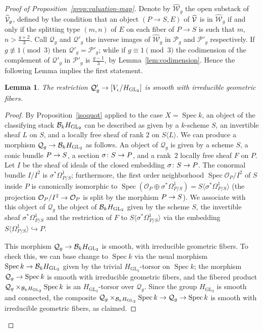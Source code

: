 \documentclass{amsart}
\numberwithin{equation}{section}
\numberwithin{subsection}{section}
\newtheorem{lemma}[theorem]{Lemma}
\theoremstyle{definition}
\theoremstyle{remark}
\newcommand\cO{\mathcal{O}} \newcommand\cP{\mathcal{P}}
\newcommand\cQ{\mathcal{Q}} \newcommand\cR{\mathcal{R}}
\newcommand\cW{\mathcal{W}} \newcommand\cX{\mathcal{X}}
\newcommand\arr{\ifinner\to\else\longrightarrow\fi}
\newcommand\into{\hookrightarrow}
\newcommand\spec{\operatorname{Spec}}
\newcommand\generate[1]{\langle #1 \rangle}
\newcommand{\GL}{\mathrm{GL}}
\newcommand\Hg{H_{\GL_2}}
\newcommand\Ve{V_{\epsilon}}
\begin{document}
\begin{proof}[Proof of Proposition~\ref{prop:valuation-map}]
Denote by $\widehat{\cW}_{g}$ the open substack of $\widehat{\mathcal{V}}_{g}$, defined by the condition that an object $(P \to S, E)$ of $\widehat{\mathcal{V}}$ is in $\widehat{\cW}_{g}$ if and only if the splitting type $(m, n)$ of $E$ on each fiber of $P \to S$ is such that $m$, $n > \frac{g+2}{3}$. Call $\cQ_{g}$ and $\cQ'_{g}$ the inverse images of $\widehat{\cW}_{g}$ in $\cP_{g}$ and $\cP'_{g}$ respectively. If $g \not\equiv 1 \pmod 3$ then $\cQ'_{g} = \cP'_{g}$; while if $g \equiv 1 \pmod 3$ the codimension of the complement of $\cQ'_{g}$ in $\cP'_{g}$ is $\frac{g-1}{3}$, by Lemma~\ref{lem:codimension}. Hence the following Lemma implies the first statement.



\begin{lemma}
The restriction $\cQ'_{g} \arr [\Ve/\Hg]$ is smooth with irreducible geometric fibers.
\end{lemma}

\begin{proof}
By Proposition~\ref{isoquot} applied to the case $X = \spec k$, an object of the classifying stack $\cB_{k}\Hg$ can be described as given by a $k$-scheme $S$, an invertible sheaf $L$ on $S$, and a locally free sheaf of rank $2$ on $S\generate{L}$. We can produce a morphism $\cQ_{g} \arr \cB_{k}\Hg$ as follows. An object of $\cQ_{g}$ is given by a scheme $S$, a conic bundle $P \arr S$, a section $\sigma\colon S \arr P$, and a rank~$2$ locally free sheaf $F$ on $P$. Let $I$ be the sheaf of ideals of the closed embedding $\sigma\colon S \arr P$. The conormal bundle $I/I^{2}$ is $\sigma^{*}\Omega^{1}_{P/S}$; furthermore, the first order neighborhood $\spec \cO_{P}/I^{2}$ of $S$ inside $P$ is canonically isomorphic to $\spec(\cO_{P} \oplus \sigma^{*}\Omega^{1}_{P/S}) = S\generate{\sigma^{*}\Omega^{1}_{P/S}}$ (the projection $\cO_{P}/I^{2} \arr \cO_{P}$ is split by the morphism $P \arr S$). We associate with this object of $\cQ_{g}$ the object of $\cB_{k}\Hg$ given by the scheme $S$, the invertible sheaf $\sigma^{*}\Omega^{1}_{P/S}$ and the restriction of $F$ to $S\generate{\sigma^{*}\Omega^{1}_{P/S}}$ via the embedding $S\generate{\Omega^{1}_{P/S}} \into P$.

This morphism $\cQ_{g} \arr \cB_{k}\Hg$ is smooth, with irreducible geometric fibers. To check this, we can base change to $\spec k$ via the usual morphism $\spec k \arr \cB_{k}\Hg$ given by the trivial $\Hg$-torsor on $\spec k$; the morphism $\cQ_{g} \arr \spec k$ is smooth with irreducible geometric fibers, and the fibered product $\cQ_{g}\times_{\cB_{k}\Hg}\spec k$ is an $\Hg$-torsor over $\cQ_{g}$. Since the group $\Hg$ is smooth and connected, the composite $\cQ_{g}\times_{\cB_{k}\Hg}\spec k \arr \cQ_{g} \arr \spec k$ is smooth with irreducible geometric fibers, as claimed.


\end{proof}
\end{proof}
\end{document}
